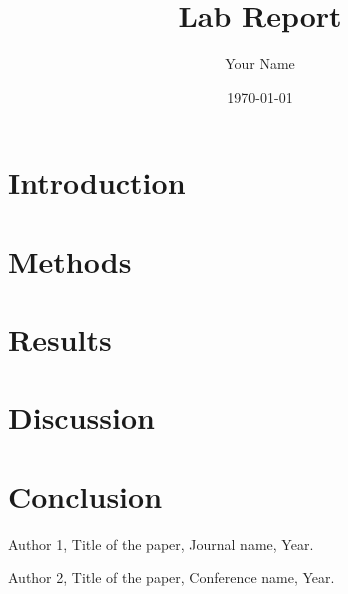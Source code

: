 \documentclass{article}
\title{Lab Report}
\author{Your Name}
\date{\today}
\begin{document}
\maketitle

\section{Introduction}

\section{Methods}

\section{Results}

\section{Discussion}

\section{Conclusion}

\begin{thebibliography}{9}
Author 1, Title of the paper, Journal name, Year.

Author 2, Title of the paper, Conference name, Year.
\end{thebibliography}
\end{document}
